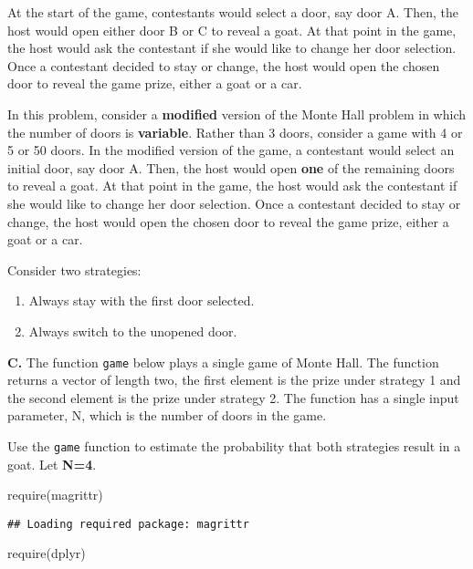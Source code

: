 \documentclass[
]{article}
\newenvironment{Shaded}{\begin{snugshade}}{\end{snugshade}}
\newcommand{\FunctionTok}[1]{\textcolor[rgb]{0.00,0.00,0.00}{#1}}
\newcommand{\NormalTok}[1]{#1}
\providecommand{\tightlist}{%
  \setlength{\itemsep}{0pt}\setlength{\parskip}{0pt}}
\begin{document}
At the start of the game, contestants would select a door, say door A.
Then, the host would open either door B or C to reveal a goat. At that
point in the game, the host would ask the contestant if she would like
to change her door selection. Once a contestant decided to stay or
change, the host would open the chosen door to reveal the game prize,
either a goat or a car.

In this problem, consider a \textbf{modified} version of the Monte Hall
problem in which the number of doors is \textbf{variable}. Rather than 3
doors, consider a game with 4 or 5 or 50 doors. In the modified version
of the game, a contestant would select an initial door, say door A.
Then, the host would open \textbf{one} of the remaining doors to reveal
a goat. At that point in the game, the host would ask the contestant if
she would like to change her door selection. Once a contestant decided
to stay or change, the host would open the chosen door to reveal the
game prize, either a goat or a car.

Consider two strategies:

\begin{enumerate}
\def\labelenumi{\arabic{enumi}.}
\tightlist
\item
  Always stay with the first door selected.
\item
  Always switch to the unopened door.
\end{enumerate}

\textbf{C.} The function \texttt{game} below plays a single game of
Monte Hall. The function returns a vector of length two, the first
element is the prize under strategy 1 and the second element is the
prize under strategy 2. The function has a single input parameter, N,
which is the number of doors in the game.

Use the \texttt{game} function to estimate the probability that both
strategies result in a goat. Let \textbf{N=4}.

\begin{Shaded}
\begin{Highlighting}[]
\FunctionTok{require}\NormalTok{(magrittr)}
\end{Highlighting}
\end{Shaded}

\begin{verbatim}
## Loading required package: magrittr
\end{verbatim}

\begin{Shaded}
\begin{Highlighting}[]
\FunctionTok{require}\NormalTok{(dplyr)}
\end{Highlighting}
\end{Shaded}
\end{document}
